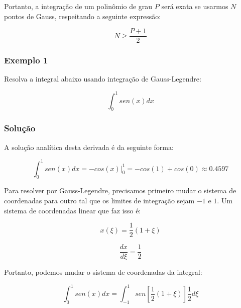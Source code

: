         Portanto, a integração de um polinômio de grau $P$ será exata se usarmos $N$ pontos de Gauss, respeitando a seguinte expressão:

        \begin{equation}
            N \geq \frac{P+1}{2}
        \end{equation}

        \subsubsection{Exemplo 1}

        Resolva a integral abaixo usando integração de Gauss-Legendre:

         \begin{equation*}
            \int_{0}^{1} sen(x) dx
        \end{equation*}

        \subsubsection*{Solução}

        A solução analítica desta derivada é da seguinte forma:

        \begin{equation*}
            \int_{0}^{1} sen(x) dx = -\left.cos(x)\right|_0^1 = -cos(1)+cos(0) \approx 0.4597
        \end{equation*}

        Para resolver por Gauss-Legendre, precisamos primeiro mudar o sistema de coordenadas para outro tal que os limites de integração sejam $-1$ e $1$. Um sistema de coordenadas linear que faz isso é:

        \begin{equation*}
            x(\xi) = \frac{1}{2}\left(1+\xi\right)
        \end{equation*}

        \begin{equation*}
            \frac{dx}{d\xi} = \frac{1}{2}
        \end{equation*}

        Portanto, podemos mudar o sistema de coordenadas da integral:

        \begin{equation*}
            \int_{0}^{1} sen(x) dx = \int_{-1}^{1} sen\left[\frac{1}{2}\left(1+\xi\right)\right] \frac{1}{2} d\xi
        \end{equation*}

